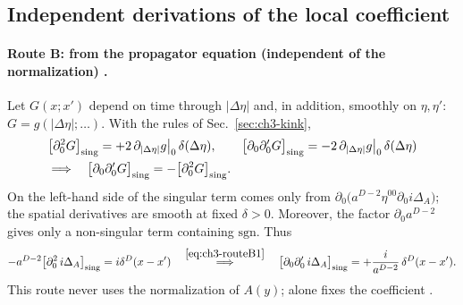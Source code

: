 \subsection{Independent derivations of the local coefficient}

\paragraph{Route B: from the propagator equation (independent of the normalization) \tD.}
Let $G(x;x')$ depend on time through $|\Delta\eta|$ and, in addition, smoothly on $\eta,\eta'$: $G=g(|\Delta\eta|;\ldots)$. With the rules of Sec.~\ref{sec:ch3-kink},
\begin{equation}
\begin{aligned}
&\big[\partial_0^2G\big]_{\rm sing}=+2\,\partial_{|\Delta\eta|}g\big|_0\,\delta(\Delta\eta),\qquad \big[\partial_0\partial'_0G\big]_{\rm sing}=-2\,\partial_{|\Delta\eta|}g\big|_0\,\delta(\Delta\eta)\\
&\Longrightarrow\quad \big[\partial_0\partial'_0G\big]_{\rm sing}=-\big[\partial_0^2G\big]_{\rm sing}.
\end{aligned}
\label{eq:ch3-routeB1}
\end{equation}
On the left-hand side of  the singular term comes only from $\partial_0\big(a^{D-2}\eta^{00}\partial_0i\Delta_A\big)$; the spatial derivatives are smooth at fixed $\delta>0$.
Moreover, the factor $\partial_0a^{D-2}$ gives only a non-singular term containing $\mathrm{sgn}$. Thus
\begin{equation}
-a^{D-2}\big[\partial_0^2\,i\Delta_A\big]_{\rm sing}=i\delta^D(x-x')\quad\overset{\eqref{eq:ch3-routeB1}}{\Longrightarrow}\quad\big[\partial_0\partial'_0\,i\Delta_A\big]_{\rm sing}=+\frac{i}{a^{D-2}}\,\delta^D(x-x') .
\label{eq:ch3-routeB2}
\end{equation}
This route never uses the normalization of $A(y)$;  alone fixes the coefficient \chIIIok.

